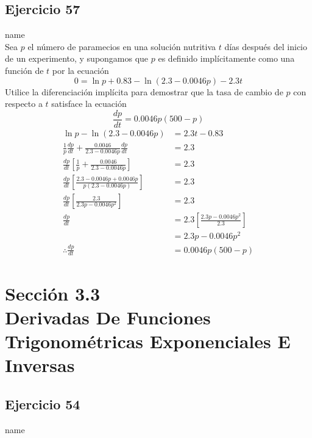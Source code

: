 \documentclass[12pt]{article}
\begin{document}
\subsection{Ejercicio 57} name \\

Sea $p$ el número de paramecios en una solución nutritiva $t$ días después del inicio de un experimento, y supongamos que $p$ es definido implícitamente como una función de $t$ por la ecuación
\[
0 = \ln p + 0.83 − \ln(2.3 − 0.0046p) − 2.3t
\]
Utilice la diferenciación implícita para demostrar que la tasa de cambio de $p$ con respecto a $t$ satisface la ecuación
\[
\frac{dp}{dt} = 0.0046p(500-p)
\]
\begin{equation*}
  \begin{split}
    \ln p - \ln(2.3 − 0.0046p)
    &= 2.3t -0.83 \\
    \frac{1}{p}\frac{dp}{dt}+\frac{0.0046}{2.3-0.0046p}\frac{dp}{dt}
    &= 2.3 \\
    \frac{dp}{dt}\left[\frac{1}{p}+\frac{0.0046}{2.3-0.0046p}\right]
    &= 2.3 \\
    \frac{dp}{dt}\left[\frac{2.3-0.0046p+ 0.0046p}{p(2.3-0.0046p)}\right]
    &= 2.3 \\
    \frac{dp}{dt}\left[\frac{2.3}{2.3p-0.0046p^2}\right]
    &= 2.3 \\
    \frac{dp}{dt}
    &= 2.3\left[\frac{2.3p-0.0046p^2}{2.3}\right] \\
    &= 2.3p-0.0046p^2 \\
    \therefore \frac{dp}{dt}
    &= 0.0046p(500-p)
  \end{split}
\end{equation*}

\section{Sección 3.3 \\ Derivadas De Funciones Trigonométricas Exponenciales E Inversas} 
\subsection{Ejercicio 54} name \\
\end{document}

